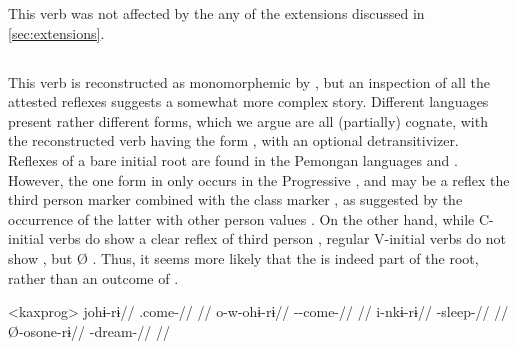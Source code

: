 This verb was not affected by the any of the extensions discussed in \cref{sec:extensions}.

\subsection{ }
\label{sec:come}



This verb is reconstructed as monomorphemic  by \textcite[30]{gildea2007greenberg}, but an inspection of all the attested reflexes  suggests a somewhat more complex story.
Different languages present rather different forms, which we argue are all (partially) cognate, with the reconstructed \PC verb having the form , with an optional detransitivizer.
Reflexes of a bare initial root  are found in the Pemongan languages and \kaxui.
However, the one form in \kaxui only occurs in the Progressive , and  may be a reflex the \settwo third person marker  combined with  the  class marker , as suggested by the occurrence of the latter with other person values .
On the other hand, while C-initial verbs do show a clear reflex of third person  , regular V-initial verbs do not show , but Ø .
Thus, it seems more likely that the  is indeed part of the root, rather than an outcome of .

\pex<kaxprog>\kaxui {}
\begingl
\gla johɨ-rɨ//
\glb {}.come-//
\glft {}//
\endgl
{}
\begingl
\gla o-w-ohɨ-rɨ//
\glb {}--come-//
\glft {}//
\endgl
{}
\begingl
\gla i-nkɨ-rɨ//
\glb {}-sleep-//
\glft {}//
\endgl
{}
\begingl
\gla Ø-osone-rɨ//
\glb {}-dream-//
\glft {}//
\endgl
\xe

